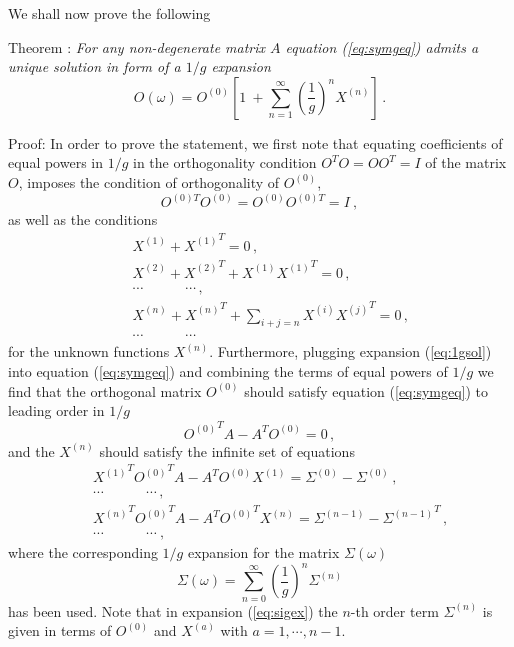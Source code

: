 \documentclass[a4paper,12pt]{article}
\newcommand{\nn}{\nonumber}
\begin{document}
We shall now prove the following

{\sf Theorem} :
\emph{ For any non-degenerate matrix $A$
equation (\ref{eq:symgeq}) admits a unique solution
in form of a $1/g$ expansion}
\begin{equation}
\label{eq:1gsol}
O(\omega) = O^{(0)}\left[1\ +\sum_{n=1}^{\infty}
\left(\frac{1}{g}\right)^n X^{(n)}\right]\,.
\end{equation}

{\sf Proof:}
In order to prove the statement, we first note that equating coefficients
of equal powers in $1/g$ in the orthogonality condition $O^TO = OO^T=I$ of
the matrix $O$, imposes the condition of orthogonality of $O^{(0)}$,
\begin{equation}
\label{orth}
O^{(0)T}O^{(0)}=O^{(0)}O^{(0)T}=I~,
\end{equation}
as well as the conditions
\begin{eqnarray}
&& X^{(1)} +  {X^{(1)}}^T = 0\,, \nn \\
&& X^{(2)} +  {X^{(2)}}^T +  X^{(1)}{X^{(1)}}^T = 0\,, \nn \\
&& \cdots  \quad\qquad  \cdots \,, \nn \\
&& X^{(n)} + {X^{(n)}}^T + \sum_{i+j=n}X^{(i)}{X^{(j)}}^T = 0\,, \nn \\
&& \cdots  \quad \qquad \cdots
\label{eq:ofn}
\end{eqnarray}
for the unknown functions $X^{(n)}$.
Furthermore, plugging expansion (\ref{eq:1gsol})
into equation (\ref{eq:symgeq}) and combining the terms of equal powers of $1/g$
we find that the orthogonal matrix $O^{(0)}$ should satisfy equation
(\ref{eq:symgeq}) to leading order in $1/g$
\begin{equation}
\label{eq:f0}
{O^{(0)}}^TA - A^T{O^{(0)}}=0\,,
\end{equation}
and the $X^{(n)}$ should satisfy the infinite set of equations
\begin{eqnarray}
&& {X^{(1)}}^T{O^{(0)}}^TA - A^T{O^{(0)}}{X^{(1)}}
= \Sigma^{(0)}- {\Sigma^{(0)}}\,, \nn\\
&& \cdots  \quad\qquad  \cdots \,, \nn \\
&& {X^{(n)}}^T{O^{(0)}}^TA- A^T{O^{(0)}}^T{X^{(n)}}
= \Sigma^{(n-1)}- {\Sigma^{(n-1)}}^T\,, \nn \\
&& \cdots  \quad \qquad \cdots~,
\label{eq:fn}
\end{eqnarray}
where the corresponding $1/g$ expansion for the matrix $\Sigma(\omega)$
\begin{equation}\label{eq:sigex}
\Sigma(\omega) = \sum_{n=0}^{\infty}
\left(\frac{1}{g}\right)^n \Sigma^{(n)}
\end{equation}
has been used.
Note that in expansion (\ref{eq:sigex})
the $n$-th  order term $\Sigma^{(n)}$ is given in terms of
$O^{(0)}$ and $X^{(a)}$ with $ a = 1,\cdots ,n-1$.
\end{document}

